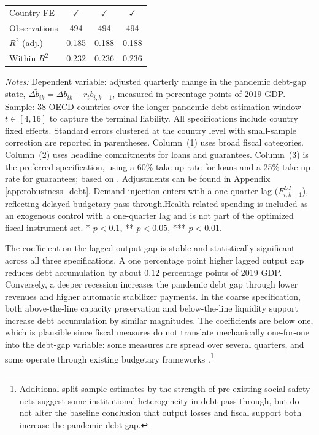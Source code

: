 \documentclass[12pt, a4paper]{article}
\begin{document}
\begin{table}[H]
\begin{tabular}{@{} l c c c @{}}
  \midrule
  Country FE & $\checkmark$ & $\checkmark$ & $\checkmark$ \\
  Observations & 494 & 494 & 494 \\
  $R^2$ (adj.) & 0.185 & 0.188 & 0.188 \\
  Within $R^2$ & 0.232 & 0.236 & 0.236 \\
  \bottomrule
  \end{tabular}
  \vspace{4pt}
  \parbox{\textwidth}{\scriptsize\textit{Notes:} Dependent variable: adjusted quarterly change in the pandemic debt-gap state, $\Delta \tilde b_{ik}=\Delta
  b_{ik}-r_t b_{i,k-1}$, measured in percentage points of 2019 GDP. Sample: 38 OECD countries over the longer pandemic debt-estimation window $t \in [4,16]$ to capture the terminal liability. All specifications include country fixed effects. Standard errors clustered at the country level with small-sample correction are reported in parentheses.
  Column~(1) uses broad fiscal categories. Column~(2) uses headline commitments for loans and guarantees. Column~(3) is the preferred specification, using a
  60\% take-up rate for loans and a 25\% take-up rate for guarantees; based on \citep{esrb2021monitoring, europeanparliament2022guarantees}. Adjustments can be found in Appendix \ref{app:robustness_debt}. Demand injection enters with a one-quarter lag ($F^{DI}_{i,k-1}$), reflecting delayed budgetary pass-through.Health-related spending is included as an exogenous control with a one-quarter lag and is not part of the optimized fiscal instrument set.  * $p<0.1$, ** $p<0.05$, *** $p<0.01$.}
  \end{table}


\noindent The coefficient on the lagged output gap is stable and statistically significant across all three specifications. A one percentage point higher lagged output gap reduces debt accumulation by about $0.12$ percentage points of 2019 GDP. Conversely, a deeper recession increases the pandemic debt gap through lower revenues and higher automatic stabilizer payments. In the coarse specification, both above-the-line capacity preservation and below-the-line liquidity support increase debt accumulation by similar magnitudes. The coefficients are below one, which is plausible since fiscal measures do not translate mechanically one-for-one into the debt-gap variable: some measures are spread over several quarters, and some operate through existing budgetary frameworks \citep{imf2022fiscalmonitor}.\footnote{Additional split-sample estimates by the strength of pre-existing social safety nets suggest some institutional heterogeneity in debt pass-through, but do not alter the baseline conclusion that output losses and fiscal support both increase the pandemic debt gap.}
\end{document}
